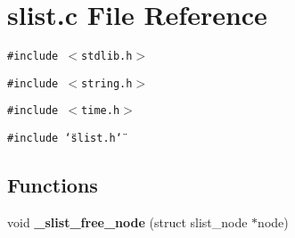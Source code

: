 \section{slist.c File Reference}
\label{slist_8c}
{\tt \#include $<$stdlib.h$>$}\par
{\tt \#include $<$string.h$>$}\par
{\tt \#include $<$time.h$>$}\par
{\tt \#include \char`\"{}slist.h\char`\"{}}\par
\subsection*{Functions}
\begin{CompactItemize}
\item 
void {\bf \_\-slist\_\-free\_\-node} (struct slist\_\-node $\ast$node)\label{slist_8c_a1}


\end{CompactItemize}
